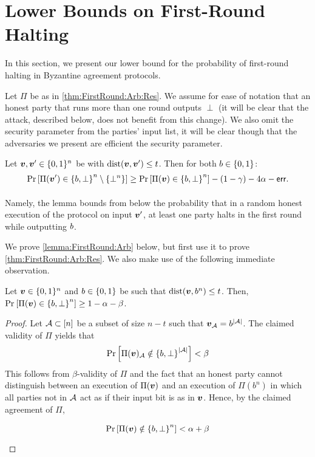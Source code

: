 
\section{Lower Bounds on First-Round Halting}\label{sec:FirstRound}

In this section, we present our lower bound for the probability of first-round halting in Byzantine agreement protocols.
\begin{theorem}\label{thm:FirstRound:Arb:Res}
\ThmFirstRoundArb
\end{theorem}

Let $\Pi$ be as in \cref{thm:FirstRound:Arb:Res}. We assume for ease of notation that an honest party that runs more than one round outputs $\perp$ (it will be clear that the attack, described below, does not benefit from this change).
We also omit the security parameter from the parties' input list, it will be clear though that the adversaries we present are efficient \wrt the security parameter.


\begin{lemma}\label{lemma:FirstRound:Arb}
	Let ${ \boldsymbol{v}},{ \boldsymbol{v}}' \in {\{0,1\}^n}$ be with $\mathrm{dist}({ \boldsymbol{v}},{ \boldsymbol{v}}') \le t$. Then for both $b\in \{0,1\}$:
	\[
	\Pr_{}\left[\Pi({ \boldsymbol{v}}') \in \left\{b,\bot\right\}^n \setminus \left\{\bot^n\right\}\right] \ge	\Pr_{}\left[\Pi({ \boldsymbol{v}}) \in \left\{b,\bot\right\}^n\right] - (1- \gamma) - 4\alpha - \mathsf{err}.
	\]
\end{lemma}
Namely, the lemma bounds from below the probability that in a random honest execution of the protocol on input ${ \boldsymbol{v}}'$, at least one party halts in the first round while outputting $b$.

We prove \cref{lemma:FirstRound:Arb} below, but first use it to prove \cref{thm:FirstRound:Arb:Res}. We also make use of the following immediate observation.
\begin{claim}\label{claim:FirstRoundound:Arb:Validity}
Let ${ \boldsymbol{v}} \in {\{0,1\}^n}$ and $b \in \{0,1\}$ be such that $\mathrm{dist}({ \boldsymbol{v}},b^n) \le t$. Then, $\Pr_{}\left[\Pi({ \boldsymbol{v}}) \in \left\{b,\bot\right\}^n\right] \ge 1 - \alpha - \beta$.
\end{claim}
\begin{proof}
Let $\mathcal{A} \subset [n]$ be a subset of size $n-t$ such that ${ \boldsymbol{v}}_{\mathcal{A}} = b^{\left|\mathcal{A}\right|}$. The claimed validity of $\Pi$ yields that
\begin{align*}
\Pr_{}\left[\Pi({ \boldsymbol{v}})_{\mathcal{A}} \notin \left\{b,\bot\right\}^{\left|\mathcal{A}\right|}\right] < \beta
\end{align*}
This follows from $\beta$-validity of $\Pi$ and the fact that an honest party cannot distinguish between an execution of $\Pi({ \boldsymbol{v}})$ and an execution of $\Pi(b^n)$ in which all parties not in $\mathcal{A}$ act as if their input bit is as in ${ \boldsymbol{v}}$. Hence, by the claimed agreement of $\Pi$,

\begin{align*}
\Pr_{}\left[\Pi({ \boldsymbol{v}}) \notin \left\{b,\bot\right\}^n\right] < \alpha + \beta
\end{align*}
\end{proof}




